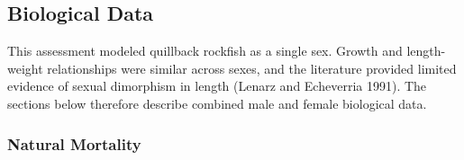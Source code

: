 \documentclass[11pt,
  english,
  a4paper,
]{article}
\begin{document}
\leavevmode\tagmcend\tagstructend\par


\hypertarget{biological-data}{%
\subsection{Biological Data}\label{biological-data}}

\leavevmode\tagmcend\tagstructend


This assessment modeled quillback rockfish as a single sex. Growth and length-weight relationships were similar across sexes, and the literature provided limited evidence of sexual dimorphism in length {(Lenarz and Echeverria 1991)\leavevmode\tagmcend\tagstructend}. The sections below therefore describe combined male and female biological data.

\leavevmode\tagmcend\tagstructend\par


\hypertarget{natural-mortality}{%
\subsubsection{Natural Mortality}\label{natural-mortality}}

\leavevmode\tagmcend\tagstructend

\end{document}
